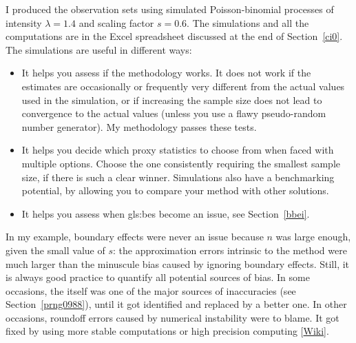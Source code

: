 \documentclass[10pt]{article}
\begin{document}
\noindent I produced the observation sets using simulated Poisson-binomial processes of intensity $\lambda=1.4$ and scaling factor $s=0.6$. The simulations and all the computations are in the Excel spreadsheet discussed at the end of Section~\ref{ci0}. The \textcolor{index}{simulations} are useful in different ways:
\begin{itemize}
\item It helps you assess if the methodology works. It does not work if the estimates are occasionally or frequently very different from the actual values used in the simulation, or if increasing the sample size does not lead to convergence to the actual values (unless you use a flawy pseudo-random number generator). My methodology passes these tests.
\item It helps you decide which proxy statistics to choose from when faced with multiple options. Choose the one consistently requiring the smallest sample size, if there is
such a clear winner. Simulations also have a benchmarking potential, by allowing you to compare your method with other solutions.
\item It helps you assess when \glspl{gls:be} become an issue, see Section~\ref{bbei}.
\end{itemize}
In my example, boundary effects were never an issue because
$n$ was large enough, given the small value of $s$: the approximation errors intrinsic to the method were much larger than the minuscule bias caused by ignoring  boundary effects.  Still, it is always good practice to quantify all potential sources of bias. In some occasions, the
 itself was one of the major sources of inaccuracies
(see Section~\ref{prng0988}), until it got identified and replaced by a better one. In other
occasions, roundoff errors caused by \textcolor{index}{numerical instability} were to blame. It got fixed by using more
stable computations or \textcolor{index}{high precision computing} [\href{https://en.wikipedia.org/wiki/Arbitrary-precision_arithmetic}{Wiki}].
\quad \\

\end{document}
